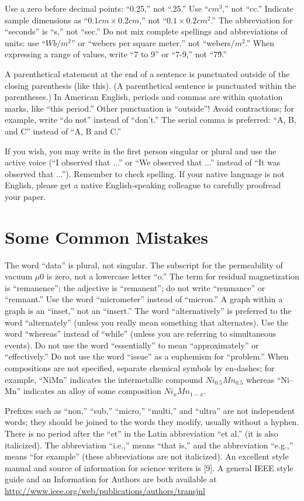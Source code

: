 \documentclass[journal,a4paper,onecolumn]{IEEEtran}
\begin{document}
Use a zero before decimal points: ``0.25,'' not ``.25.'' Use ``$cm^3$,'' not ``cc.'' Indicate sample dimensions as ``$0.1 cm \times 0.2 cm$,'' not ``$0.1 \times 0.2 cm^2$.'' The abbreviation for ``seconds'' is ``s,'' not ``sec.'' Do not mix complete spellings and abbreviations of units: use ``$Wb/m^2$'' or ``webers per square meter,'' not ``webers/$m^2$.'' When expressing a range of values, write ``7 to 9'' or ``7-9,'' not ``7\~9.''

A parenthetical statement at the end of a sentence is punctuated outside of the closing parenthesis (like this). (A parenthetical sentence is punctuated within the parentheses.) In American English, periods and commas are within quotation marks, like ``this period.'' Other punctuation is ``outside''! Avoid contractions; for example, write ``do not'' instead of ``don’t.'' The serial comma is preferred: ``A, B, and C'' instead of ``A, B and C.''

If you wish, you may write in the first person singular or plural and use the active voice (``I observed that ...'' or ``We observed that ...'' instead of ``It was observed that ...''). Remember to check spelling. If your native language is not English, please get a native English-speaking colleague to carefully proofread your paper.

\section{Some Common Mistakes}

The word ``data'' is plural, not singular. The subscript for the permeability of vacuum $\mu 0$ is zero, not a lowercase letter ``o.'' The term for residual magnetization is ``remanence''; the adjective is ``remanent''; do not write ``remnance'' or ``remnant.'' Use the word ``micrometer'' instead of ``micron.'' A graph within a graph is an ``inset,'' not an ``insert.'' The word ``alternatively'' is preferred to the word ``alternately'' (unless you really mean something that alternates). Use the word ``whereas'' instead of ``while'' (unless you are referring to simultaneous events). Do not use the word ``essentially'' to mean ``approximately'' or ``effectively.'' Do not use the word ``issue'' as a euphemism for ``problem.'' When compositions are not specified, separate chemical symbols by en-dashes; for example, ``NiMn'' indicates the intermetallic compound $Ni_{0.5}Mn_{0.5}$ whereas ``Ni–Mn'' indicates an alloy of some composition $Ni_xMn_{1-x}$.

Prefixes such as ``non,'' ``sub,'' ``micro,'' ``multi,'' and ``ultra'' are not independent words; they should be joined to the words they modify, usually without a hyphen. There is no period after the ``et'' in the Latin abbreviation ``et al.'' (it is also italicized). The abbreviation ``i.e.,'' means ``that is,'' and the abbreviation ``e.g.,'' means ``for example'' (these abbreviations are not italicized).
An excellent style manual and source of information for science writers is [9]. A general IEEE style guide and an Information for Authors are both available at \url{http://www.ieee.org/web/publications/authors/transjnl}
\end{document}

